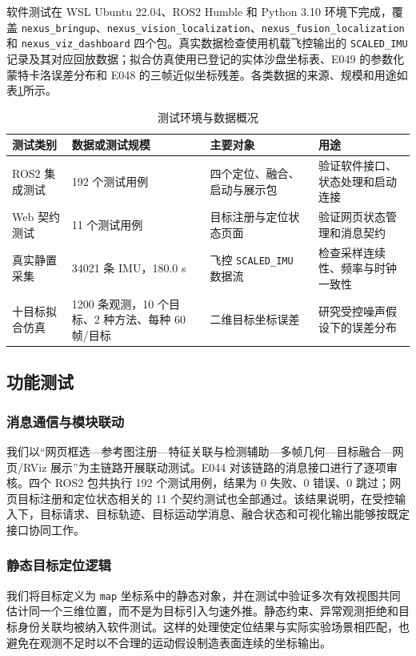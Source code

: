 \documentclass[UTF8,a4paper,12pt]{ctexart}
\begin{document}
软件测试在 WSL Ubuntu 22.04、ROS2 Humble 和 Python 3.10 环境下完成，覆盖 \texttt{nexus\_bringup}、\texttt{nexus\_vision\_localization}、\texttt{nexus\_fusion\_localization} 和 \texttt{nexus\_viz\_dashboard} 四个包。真实数据检查使用机载飞控输出的 \texttt{SCALED\_IMU} 记录及其对应回放数据；拟合仿真使用已登记的实体沙盘坐标表、E049 的参数化蒙特卡洛误差分布和 E048 的三帧近似坐标残差。各类数据的来源、规模和用途如表\ref{tab:test-data}所示。

\begin{table}[htbp]
  \centering
  \small
  \caption{测试环境与数据概况}\label{tab:test-data}
  \begin{tabular}{p{2.1cm}p{3.0cm}p{3.2cm}p{4.5cm}}
    \toprule
    测试类别 & 数据或测试规模 & 主要对象 & 用途 \\
    \midrule
    ROS2 集成测试 & 192 个测试用例 & 四个定位、融合、启动与展示包 & 验证软件接口、状态处理和启动连接 \\
    Web 契约测试 & 11 个测试用例 & 目标注册与定位状态页面 & 验证网页状态管理和消息契约 \\
    真实静置采集 & 34021 条 IMU，180.0 s & 飞控 \texttt{SCALED\_IMU} 数据流 & 检查采样连续性、频率与时钟一致性 \\
    十目标拟合仿真 & 1200 条观测，10 个目标、2 种方法、每种 60 帧/目标 & 二维目标坐标误差 & 研究受控噪声假设下的误差分布 \\
    \bottomrule
  \end{tabular}
\end{table}

\subsection{功能测试}
\subsubsection{消息通信与模块联动}
我们以“网页框选—参考图注册—特征关联与检测辅助—多帧几何—目标融合—网页/RViz 展示”为主链路开展联动测试。E044 对该链路的消息接口进行了逐项审核。四个 ROS2 包共执行 192 个测试用例，结果为 0 失败、0 错误、0 跳过；网页目标注册和定位状态相关的 11 个契约测试也全部通过。该结果说明，在受控输入下，目标请求、目标轨迹、目标运动学消息、融合状态和可视化输出能够按既定接口协同工作。

\subsubsection{静态目标定位逻辑}
我们将目标定义为 \texttt{map} 坐标系中的静态对象，并在测试中验证多次有效视图共同估计同一个三维位置，而不是为目标引入匀速外推。静态约束、异常观测拒绝和目标身份关联均被纳入软件测试。这样的处理使定位结果与实际实验场景相匹配，也避免在观测不足时以不合理的运动假设制造表面连续的坐标输出。
\end{document}
